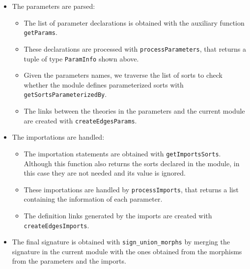 \begin{itemize}
\item The parameters are parsed:

\begin{itemize}
\item The list of parameter declarations is obtained with the auxiliary
function \verb"getParams".
\item These declarations are processed with \verb"processParameters",
that returns a tuple of type \verb"ParamInfo" shown above.
\item Given the parameters names, we traverse the list of sorts to check
whether the module defines parameterized sorts with \verb"getSortsParameterizedBy".
\item The links between the theories in the parameters and the current module
are created with \verb"createEdgesParams".
\end{itemize}

\item The importations are handled:

\begin{itemize}
\item The importation statements are obtained with \verb"getImportsSorts".
Although this function also returns the sorts declared in the module, in
this case they are not needed and its value is ignored.
\item These importations are handled by \verb"processImports", that
returns a list containing the information of each parameter.
\item The definition links generated by the imports are created with
\verb"createEdgesImports".
\end{itemize}

\item The final signature is obtained with \verb"sign_union_morphs"
by merging the signature in the current module with the ones obtained
from the morphisms from the parameters and the imports.

\end{itemize}

